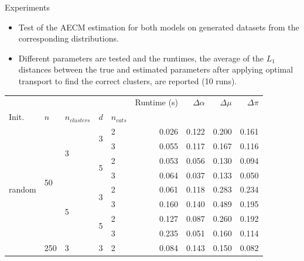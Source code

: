 \documentclass{beamer}
\begin{document}
\begin{frame}{Experiments}
    \begin{itemize}
        \item Test of the AECM estimation for both models on generated datasets from the corresponding distributions.
        \item Different parameters are tested and the runtimes, the average of the $L_1$ distances between the true and estimated parameters after applying optimal transport to find the correct clusters, are reported (10 runs). 
    \end{itemize}

    \begin{table}[H]
        \centering
        \begin{minipage}{.48\columnwidth}
            \centering
            \begin{adjustbox}{width=\columnwidth}
                \begin{tabular}{lllllrrrr}
                 &  &  &  &  & Runtime (s) & $\Delta \alpha$ & $\Delta \mu$ & $\Delta \pi$ \\
                Init. & $n$ & $n_{clusters}$ & $d$ & $n_{cats}$ &  &  &  &  \\
                \cline{1-9} \cline{2-9} \cline{3-9} \cline{4-9}
                \multirow[t]{16}{*}{random} & \multirow[t]{8}{*}{50} & \multirow[t]{4}{*}{3} & \multirow[t]{2}{*}{3} & 2 & 0.026 & 0.122 & 0.200 & 0.161 \\
                 &  &  &  & 3 & 0.055 & 0.117 & 0.167 & 0.116 \\
                \cline{4-9}
                 &  &  & \multirow[t]{2}{*}{5} & 2 & 0.053 & 0.056 & 0.130 & 0.094 \\
                 &  &  &  & 3 & 0.064 & 0.037 & 0.133 & 0.050 \\
                \cline{3-9} \cline{4-9}
                 &  & \multirow[t]{4}{*}{5} & \multirow[t]{2}{*}{3} & 2 & 0.061 & 0.118 & 0.283 & 0.234 \\
                 &  &  &  & 3 & 0.160 & 0.140 & 0.489 & 0.195 \\
                \cline{4-9}
                 &  &  & \multirow[t]{2}{*}{5} & 2 & 0.127 & 0.087 & 0.260 & 0.192 \\
                 &  &  &  & 3 & 0.235 & 0.051 & 0.160 & 0.114 \\
                \cline{2-9} \cline{3-9} \cline{4-9}
                 & \multirow[t]{8}{*}{250} & \multirow[t]{4}{*}{3} & \multirow[t]{2}{*}{3} & 2 & 0.084 & 0.143 & 0.150 & 0.082 \\

\end{tabular}
\end{adjustbox}
\end{minipage}
\end{table}
\end{frame}
\end{document}
